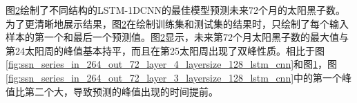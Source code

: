 \begin{figure}[!htbp]
\begin{subfigure}[b]{1.0\textwidth}
    \label{fig:ssn_series_in_264_out_72_layer_5_layersize_256_lstm_cnn}
    \end{subfigure}
  \vspace{-2cm}
  \label{fig:ssn_series_in_264_out_72_lstm_cnn}
\end{figure}

图\ref{fig:ssn_series_in_264_out_72_lstm_cnn}绘制了不同结构的LSTM-1DCNN的最佳模型预测未来72个月的太阳黑子数。为了更清晰地展示结果，图\ref{fig:ssn_series_in_264_out_72_lstm_cnn}在绘制训练集和测试集的结果时，只绘制了每个输入样本的第一个和最后一个预测值。图\ref{fig:ssn_series_in_264_out_72_lstm_cnn}显示，未来第72个月太阳黑子数的最大值与第24太阳周的峰值基本持平，而且在第25太阳周出现了双峰性质。相比于图\ref{fig:ssn_series_in_264_out_72_layer_4_layersize_128_lstm_cnn}和图\ref{fig:ssn_series_in_264_out_72_layer_5_layersize_256_lstm_cnn}，图\ref{fig:ssn_series_in_264_out_72_layer_3_layersize_128_lstm_cnn}中的第一个峰值比第二个大，导致预测的峰值出现的时间提前。

